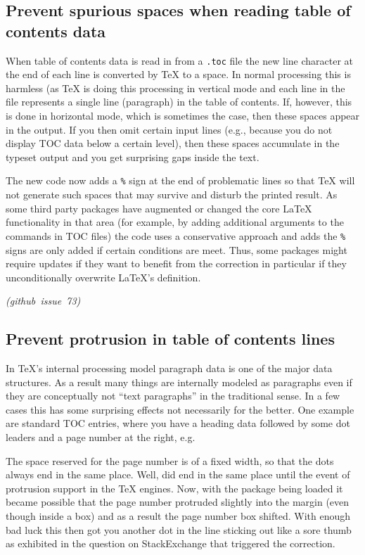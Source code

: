 \documentclass{ltnews}
\newcommand\githubissue[2][]{\ifhmode\unskip\fi
     \quad\penalty500\strut\nobreak\hfill
     \mbox{\small\itshape(github issue#1 #2)}\par}
\begin{document}
\subsection{Prevent spurious spaces when reading table of contents data}

When table of contents data is read in from a \texttt{.toc} file the
new line character at the end of each line is converted by \TeX{} to a
space. In normal processing this is harmless (as \TeX{} is doing this
processing in vertical mode and each line in the file represents a
single line (paragraph) in the table of contents. If, however, this is
done in horizontal mode, which is sometimes the case, then these
spaces appear in the output. If you then omit certain input lines
(e.g., because you do not display TOC data below a certain level),
then these spaces accumulate in the typeset output and you get
surprising gaps inside the text.

The new code now adds a \texttt{\%} sign at the end of problematic
lines so that \TeX{} will not generate such spaces that may survive
and disturb the printed result. As some third party packages have
augmented or changed the core \LaTeX{} functionality in that area (for
example, by adding additional arguments to the commands in TOC files)
the code uses a conservative approach and adds the \texttt{\%} signs
are only added if certain conditions are meet. Thus, some packages
might require updates if they want to benefit from the correction in
particular if they unconditionally overwrite \LaTeX{}'s
 definition.
%
\githubissue{73}


\subsection{Prevent protrusion in table of contents lines}

In \TeX{}'s internal processing model paragraph data is one of the
major data structures. As a result many things are internally modeled
as paragraphs even if they are conceptually not ``text paragraphs'' in
the traditional sense. In a few cases this has some surprising effects
not necessarily for the better. One example are standard TOC entries,
where you have a heading data followed by some dot leaders and a page
number at the right, e.g.
\begin{quote}
\end{quote}
The space reserved for the page number is of a fixed width, so that
the dots always end in the same place. Well, did end in the same place
until the event of protrusion support in the \TeX{} engines. Now, with
the  package being loaded it became possible that the
page number protruded slightly into the margin (even though inside a
box) and as a result the page number box shifted. With enough bad luck
this then got you another dot in the line sticking out like a sore
thumb as exhibited in the question on StackExchange that triggered the
correction.
\end{document}
